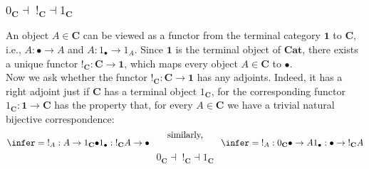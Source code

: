 \documentclass[UTF8,11pt,colorlinks,compress,openany]{beamer}%
\begin{document}
\begin{frame}\frametitle{$0_\mathbf{C}\dashv\; !_\mathbf{C}\dashv 1_\mathbf{C}$}
An object $A\in\mathbf{C}$ can be viewed as a functor from the terminal category $\mathbf{1}$ to $\mathbf{C}$, i.e., $A:\bullet\to A$ and $A: 1_\bullet\to 1_A$. Since $\mathbf{1}$ is the terminal object of $\mathbf{Cat}$, there exists a unique functor $!_\mathbf{C}:\mathbf{C}\to\mathbf{1}$, which maps every object $A\in\mathbf{C}$ to $\bullet$.\\
Now we ask whether the functor $!_\mathbf{C}:\mathbf{C}\to\mathbf{1}$ has any adjoints. Indeed,
it has a right adjoint just if $\mathbf{C}$ has a terminal object $1_\mathbf{C}$, for the corresponding functor
$1_\mathbf{C}:\mathbf{1}\to\mathbf{C}$ has the property that, for every $A\in\mathbf{C}$ we have a trivial natural bijective correspondence:
\[\infer={!_A: A\to 1_\mathbf{C}\bullet}{1_\bullet:\;!_\mathbf{C}A\to\bullet}\qquad\raisebox{2ex}{similarly,}\qquad\infer={!_A: 0_\mathbf{C}\bullet\to A}{1_\bullet: \bullet\to\;!_\mathbf{C}A}\]
\[0_\mathbf{C}\dashv\; !_\mathbf{C}\dashv 1_\mathbf{C}\]
\end{frame}
\end{document}
